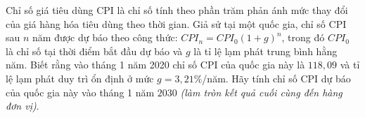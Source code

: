 \begin{ex}%
	Chỉ số giá tiêu dùng CPI là chỉ số tính theo phần trăm phản ánh mức thay đổi của giá hàng hóa tiêu dùng theo thời gian. Giả sử tại một quốc gia, chỉ số CPI sau $n$ năm được dự báo theo công thức: $CPI_n = CPI_0(1+g)^n$, trong đó $CPI_0$ là chỉ số tại thời điểm bắt đầu dự báo và $g$ là tỉ lệ lạm phát trung bình hằng năm. Biết rằng vào tháng 1 năm 2020 chỉ số CPI của quốc gia này là $118{,}09$ và tỉ lệ lạm phát duy trì ổn định ở mức $g = 3{,}21\%$/năm. Hãy tính chỉ số CPI dự báo của quốc gia này vào tháng 1 năm $2030$ \textit{(làm tròn kết quả cuối cùng đến hàng đơn vị)}.
\end{ex}

